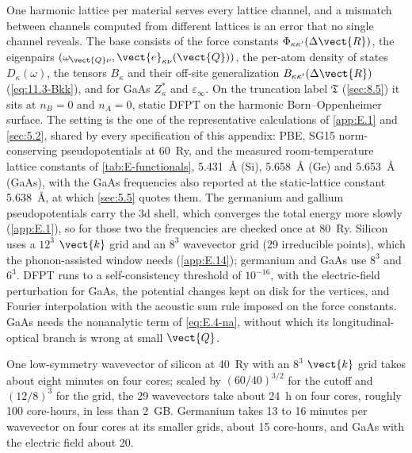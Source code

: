 One harmonic lattice per material serves every lattice channel, and a mismatch between channels computed from different lattices is an error that no single channel reveals. The base consists of the force constants $\Phi_{\kappa\kappa'}(\Delta\vect{R})$, the eigenpairs $(\omega_{\vect{Q}\nu},\vect{e}_{\kappa\nu}(\vect{Q}))$, the per-atom density of states $D_\kappa(\omega)$, the tensors $B_\kappa$ and their off-site generalization $B_{\kappa\kappa'}(\Delta\vect{R})$ (\cref{eq:11.3-Bkk}), and for GaAs $Z^*_\kappa$ and $\varepsilon_\infty$. On the truncation label $\mathfrak{T}$ (\cref{sec:8.5}) it sits at $n_B = 0$ and $n_A = 0$, static DFPT on the harmonic Born--Oppenheimer surface. The setting is the one of the representative calculations of \cref{app:E.1} and \cref{sec:5.2}, shared by every specification of this appendix: PBE, SG15 norm-conserving pseudopotentials at \SI{60}{Ry}, and the measured room-temperature lattice constants of \cref{tab:E-functionals}, \SI{5.431}{\angstrom} (Si), \SI{5.658}{\angstrom} (Ge) and \SI{5.653}{\angstrom} (GaAs), with the GaAs frequencies also reported at the static-lattice constant \SI{5.638}{\angstrom}, at which \cref{sec:5.5} quotes them. The germanium and gallium pseudopotentials carry the 3d shell, which converges the total energy more slowly (\cref{app:E.1}), so for those two the frequencies are checked once at \SI{80}{Ry}. Silicon uses a $12^3$ $\vect{k}$ grid and an $8^3$ wavevector grid (29 irreducible points), which the phonon-assisted window needs (\cref{app:E.14}); germanium and GaAs use $8^3$ and $6^3$. DFPT runs to a self-consistency threshold of $10^{-16}$, with the electric-field perturbation for GaAs, the potential changes kept on disk for the vertices, and Fourier interpolation with the acoustic sum rule imposed on the force constants. GaAs needs the nonanalytic term of \cref{eq:E.4-na}, without which its longitudinal-optical branch is wrong at small $\vect{Q}$.

One low-symmetry wavevector of silicon at \SI{40}{Ry} with an $8^3$ $\vect{k}$ grid takes about eight minutes on four cores; scaled by $(60/40)^{3/2}$ for the cutoff and $(12/8)^3$ for the grid, the 29 wavevectors take about \SI{24}{h} on four cores, roughly 100 core-hours, in less than \SI{2}{GB}. Germanium takes 13 to 16 minutes per wavevector on four cores at its smaller grids, about 15 core-hours, and GaAs with the electric field about 20.

